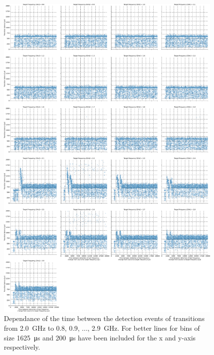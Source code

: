 \begin{figure}[]
    \centering
    \includegraphics[width=\columnwidth]{fig/ftalat_scatter_wait_transition_latency_hati_source_2.0.pdf}
    \caption{Dependance of the time between the detection events of transitions from \SI{2.0}{\GHz} to \SI{0.8}{}, \SI{0.9}{}, ..., \SI{2.9}{\GHz}. For better lines for bins of size \SI{1625}{\us} and \SI{200}{\us} have been included for the x and y-axis respectively.}
\end{figure}
